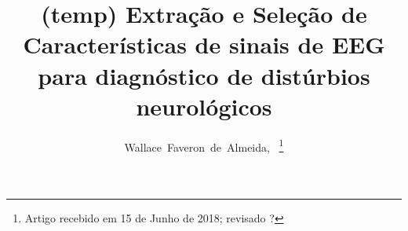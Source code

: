 \documentclass[10pt,journal,compsoc]{IEEEtran}
\begin{document}
%
\title{ (temp) Extração e Seleção de Características de sinais de EEG para diagnóstico de distúrbios neurológicos}
%
%
%
%

\author{Wallace~Faveron~de~Almeida,~%
\thanks{Artigo recebido em 15 de Junho de 2018; revisado ?}}
\end{document}
